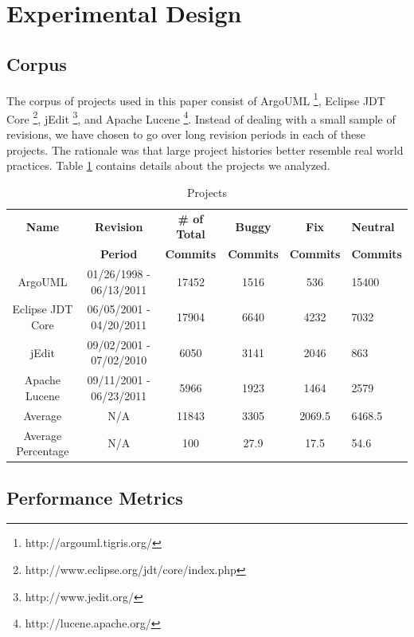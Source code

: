 \documentclass[preprint,10pt]{sigplanconf}
\providecommand{\tabularnewline}{\\}
\begin{document}
\section{Experimental Design}
\subsection{Corpus}
\label{Corpus}
The corpus of projects used in this paper
consist of ArgoUML%
\footnote{http://argouml.tigris.org/%
}, Eclipse JDT Core%
\footnote{http://www.eclipse.org/jdt/core/index.php%
}, jEdit%
\footnote{http://www.jedit.org/%
}, and Apache Lucene%
\footnote{http://lucene.apache.org/%
}. Instead of dealing with a small sample of revisions, we have chosen
to go over long revision periods in each of these projects. The rationale
was that large project histories better resemble real world practices.
Table \ref{tab:projects} contains details about the projects we analyzed.


\begin{table}
\caption{Projects}

\begin{center}
\label{tab:projects}
\setlength{\extrarowheight}{2pt}

\begin{tabular}{cccccp{2.3cm}}
\hline 
\textbf{Name}  & \textbf{Revision}  & \textbf{\# of Total}& \textbf{Buggy}& \textbf{Fix}& \textbf{Neutral}\tabularnewline
& \textbf{Period}  &\textbf{Commits} & \textbf{Commits}&\textbf{Commits}&\textbf{Commits}\tabularnewline

\hline 
ArgoUML  & 01/26/1998 - 06/13/2011  & 17452 & 1516 & 536& 15400\tabularnewline
\hline 
Eclipse JDT Core  & 06/05/2001 - 04/20/2011  & 17904 & 6640 & 4232& 7032\tabularnewline
\hline 
jEdit  & 09/02/2001 - 07/02/2010  & 6050& 3141& 2046& 863\tabularnewline
\hline 
Apache Lucene  & 09/11/2001 - 06/23/2011  & 5966& 1923& 1464& 2579\tabularnewline
\hline
Average &N/A&11843&3305&2069.5&6468.5\tabularnewline
\hline
Average Percentage& N/A&100 &27.9&17.5&54.6\tabularnewline
\hline
\end{tabular}
\end{center}


\end{table}

\subsection{Performance Metrics}
\label{section:PerformanceMetrics}
\end{document}
